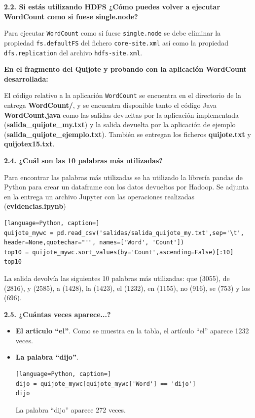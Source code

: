 \documentclass[10pt,swedish, openany]{book}
\begin{document}
\textbf{2.2. Si estás utilizando HDFS ¿Cómo puedes volver a ejecutar WordCount como si fuese single.node?}
 
Para ejecutar \texttt{WordCount} como si fuese \texttt{single.node} se debe eliminar la propiedad \texttt{fs.defaultFS} del fichero \texttt{core-site.xml} así como la propiedad \texttt{dfs.replication} del archivo \texttt{hdfs-site.xml}.


\textbf{En el fragmento del Quijote y probando con la aplicación WordCount desarrollada:}

El código relativo a la aplicación \texttt{WordCount} se encuentra en el directorio de la entrega \textbf{WordCount/}, y se encuentra disponible tanto el código Java \textbf{WordCount.java} como las salidas devueltas por la aplicación implementada (\textbf{salida\_quijote\_my.txt}) y la salida devuelta por la aplicación de ejemplo (\textbf{salida\_quijote\_ejemplo.txt}). También se entregan los ficheros \textbf{quijote.txt} y \textbf{quijotex15.txt}.

\vspace{0.8em}

\textbf{2.4. ¿Cuál son las 10 palabras más utilizadas?}

Para encontrar las palabras más utilizadas se ha utilizado la librería pandas de Python para crear un dataframe con los datos devueltos por Hadoop. Se adjunta en la entrega un archivo Jupyter con las operaciones realizadas (\textbf{evidencias.ipynb})

\begin{lstlisting}[language=Python, caption=]
quijote_mywc = pd.read_csv('salidas/salida_quijote_my.txt',sep='\t', header=None,quotechar="'", names=['Word', 'Count'])
top10 = quijote_mywc.sort_values(by='Count',ascending=False)[:10]
top10
\end{lstlisting}
La salida devolvía las siguientes 10 palabras más utilizadas: que (3055), de (2816), y (2585), a (1428), la (1423), el (1232), en (1155), no (916), se (753) y los (696).

\vspace{0.8em}

\textbf{2.5. ¿Cuántas veces aparece...?}
 \begin{itemize}
     \item \textbf{El articulo “el”}. Como se muestra en la tabla, el artículo ``el'' aparece 1232 veces.
     \item \textbf{La palabra “dijo”}. 
     \begin{lstlisting}[language=Python, caption=]
dijo = quijote_mywc[quijote_mywc['Word'] == 'dijo']
dijo
\end{lstlisting}
     La palabra ``dijo'' aparece 272 veces.\newline
 \end{itemize}
 
\end{document}
